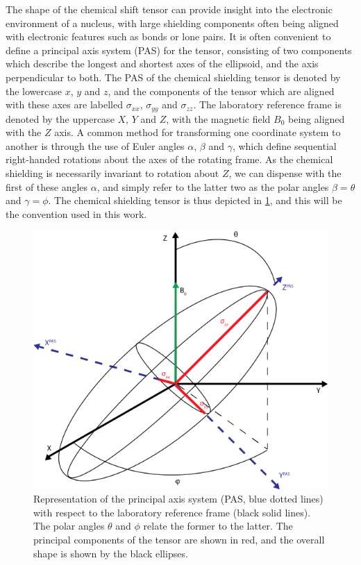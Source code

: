 \begin{refsection}
The shape of the chemical shift tensor can provide insight into the electronic environment of a nucleus, with large shielding components often being aligned with electronic features such as bonds or lone pairs.
It is often convenient to define a principal axis system (PAS) for the tensor, consisting of two components which describe the longest and shortest axes of the ellipsoid, and the axis perpendicular to both.
The PAS of the chemical shielding tensor is denoted by the lowercase $x$, $y$ and $z$, and the components of the tensor which are aligned with these axes are labelled $\sigma_{xx}$, $\sigma_{yy}$ and $\sigma_{zz}$.
The laboratory reference frame is denoted by the uppercase $X$, $Y$ and $Z$, with the magnetic field $B_0$ being aligned with the $Z$ axis.
A common method for transforming one coordinate system to another is through the use of Euler angles $\alpha$, $\beta$ and $\gamma$, which define sequential right-handed rotations about the axes of the rotating frame.
As the chemical shielding is necessarily invariant to rotation about $Z$, we can dispense with the first of these angles $\alpha$, and simply refer to the latter two as the polar angles $\beta = \theta$ and $\gamma = \phi$.
The chemical shielding tensor is thus depicted in \cref{fig:chemical-shielding-tensor}, and this will be the convention used in this work.

\begin{figure}
  \centering
  \includegraphics[width=0.4\linewidth]{Figures/Chemical_Shift_Tensor.png}
  \caption[Principal axis system with respect to laboratory reference.]{Representation of the principal axis system (PAS, blue dotted lines) with respect to the laboratory reference frame (black solid lines). The polar angles $\theta$ and $\phi$ relate the former to the latter. The principal components of the tensor are shown in red, and the overall shape is shown by the black ellipses.}
  \label{fig:chemical-shielding-tensor}
\end{figure}


\end{refsection}
